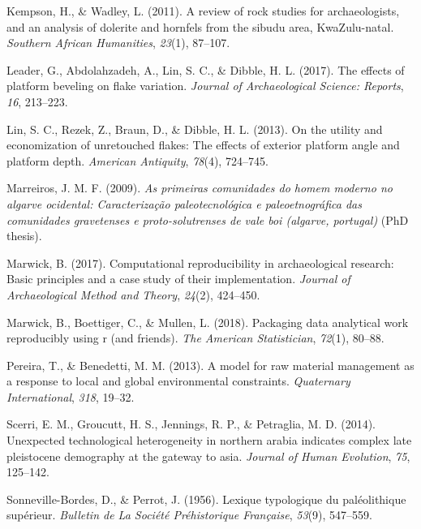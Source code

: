 \documentclass[12pt,twoside]{reedthesis}
\begin{document}
\leavevmode\hypertarget{ref-kempson2011}{}%
Kempson, H., \& Wadley, L. (2011). A review of rock studies for archaeologists, and an analysis of dolerite and hornfels from the sibudu area, KwaZulu-natal. \emph{Southern African Humanities}, \emph{23}(1), 87--107.

\leavevmode\hypertarget{ref-leader2017}{}%
Leader, G., Abdolahzadeh, A., Lin, S. C., \& Dibble, H. L. (2017). The effects of platform beveling on flake variation. \emph{Journal of Archaeological Science: Reports}, \emph{16}, 213--223.

\leavevmode\hypertarget{ref-linetal2013}{}%
Lin, S. C., Rezek, Z., Braun, D., \& Dibble, H. L. (2013). On the utility and economization of unretouched flakes: The effects of exterior platform angle and platform depth. \emph{American Antiquity}, \emph{78}(4), 724--745.

\leavevmode\hypertarget{ref-marreiros2009}{}%
Marreiros, J. M. F. (2009). \emph{As primeiras comunidades do homem moderno no algarve ocidental: Caracterização paleotecnológica e paleoetnográfica das comunidades gravetenses e proto-solutrenses de vale boi (algarve, portugal)} (PhD thesis).

\leavevmode\hypertarget{ref-marwick2017}{}%
Marwick, B. (2017). Computational reproducibility in archaeological research: Basic principles and a case study of their implementation. \emph{Journal of Archaeological Method and Theory}, \emph{24}(2), 424--450.

\leavevmode\hypertarget{ref-marwick2018}{}%
Marwick, B., Boettiger, C., \& Mullen, L. (2018). Packaging data analytical work reproducibly using r (and friends). \emph{The American Statistician}, \emph{72}(1), 80--88.

\leavevmode\hypertarget{ref-pereira2013}{}%
Pereira, T., \& Benedetti, M. M. (2013). A model for raw material management as a response to local and global environmental constraints. \emph{Quaternary International}, \emph{318}, 19--32.

\leavevmode\hypertarget{ref-scerri2014}{}%
Scerri, E. M., Groucutt, H. S., Jennings, R. P., \& Petraglia, M. D. (2014). Unexpected technological heterogeneity in northern arabia indicates complex late pleistocene demography at the gateway to asia. \emph{Journal of Human Evolution}, \emph{75}, 125--142.

\leavevmode\hypertarget{ref-sonneville-bordes1956}{}%
Sonneville-Bordes, D., \& Perrot, J. (1956). Lexique typologique du paléolithique supérieur. \emph{Bulletin de La Société Préhistorique Française}, \emph{53}(9), 547--559.
\end{document}
